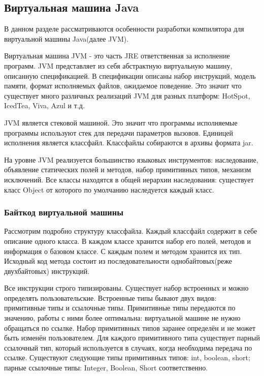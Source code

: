 \subsection{Виртуальная машина Java}
В данном разделе рассматриваются особенности разработки компилятора для виртуальной машины Java(далее JVM). 


Виртуальная машина JVM - это часть JRE ответственная за исполнение программ. JVM представляет из себя абстрактную виртуальную машину, описанную спецификацией\cite{jvm:specification}. В спецификации описаны набор инструкций, модель памяти, формат исполняемых файлов, ожидаемое поведение. Это значит что существует много различных реализаций JVM для разных платформ: HotSpot, IcedTea, Viva, Azul и т.д. 

JVM является стековой машиной. Это значит что программы исполняемые программы используют стек для передачи параметров вызовов. Единицей исполнения является классфайл. Классфайлы собираются в архивы формата jar.

На уровне JVM реализуется большинство языковых инструментов: наследование, объявление статических полей и методов, набор примитивных типов, механизм исключений. Все классы находятся в общей иерархии наследования: существует класс Object от которого по умолчанию наследуется каждый класс.

\subsubsection{Байткод виртуальной машины}
Рассмотрим подробно структуру классфайла. Каждый классфайл содержит в себе описание одного класса. В каждом классе хранится набор его полей, методов и информация о базовом классе. С каждым полем и методом хранится их тип. Исходный код метода состоит из последовательности однобайтовых(реже двухбайтовых) инструкций. 

Все инструкции строго типизированы. Существует набор встроенных и можно определять пользовательские. Встроенные типы бывают двух видов: примитивные типы и ссылочные типы. Примитивные типы передаются по значению, работы с ними более оптимальна: виртуальной машине не нужно обращаться по ссылке. Набор примитивных типов заранее определён и не может быть изменён пользователем. Для каждого примитивного типа существует парный ссылочный тип, который используется в случаях, когда необходима передача по ссылке. Существуют следующие типы примитивных типов: int, boolean, short; парные ссылочные типы: Integer, Boolean, Short соответственно.

